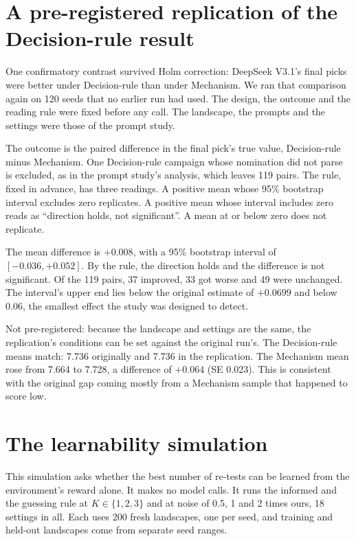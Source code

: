 \section{A pre-registered replication of the Decision-rule result}
\label{app:replication}

One confirmatory contrast survived Holm correction: DeepSeek V3.1's final picks were better under
Decision-rule than under Mechanism. We ran that comparison again on 120 seeds that no earlier run had used.
The design, the outcome and the reading rule were fixed before any call. The landscape, the prompts and
the settings were those of the prompt study.

The outcome is the paired difference in the final pick's true value, Decision-rule minus Mechanism. One
Decision-rule campaign whose nomination did not parse is excluded, as in the prompt study's analysis, which leaves 119
pairs. The rule, fixed in advance, has three readings. A positive mean whose 95\% bootstrap interval excludes
zero replicates. A positive mean whose interval includes zero reads as ``direction holds, not significant''.
A mean at or below zero does not replicate.

The mean difference is $+0.008$, with a 95\% bootstrap interval of $[-0.036, +0.052]$. By the rule, the
direction holds and the difference is not significant. Of the 119 pairs, 37 improved, 33 got worse and 49
were unchanged. The interval's upper end lies below the original estimate of $+0.0699$ and below 0.06, the smallest
effect the study was designed to detect.

Not pre-registered: because the landscape and settings are the same, the replication's conditions can be set against the original run's. The Decision-rule means match: 7.736 originally and 7.736 in the replication. The
Mechanism mean rose from 7.664 to 7.728, a difference of $+0.064$ (SE 0.023). This is consistent with the
original gap coming mostly from a Mechanism sample that happened to score low.

\section{The learnability simulation}
\label{app:sim}

This simulation asks whether the best number of re-tests can be learned from the environment's reward alone. It makes no model calls. It runs the informed and the guessing rule at $K \in \{1,2,3\}$ and at
noise of 0.5, 1 and 2 times ours, 18 settings in all. Each uses 200 fresh landscapes, one per seed, and training and
held-out landscapes come from separate seed ranges.

